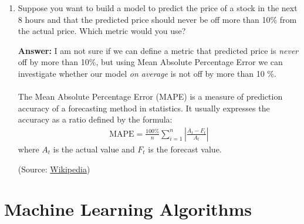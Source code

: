 \documentclass{article}
\newenvironment{QandA}{\begin{enumerate}[label=\arabic*.]}{\end{enumerate}}
\newenvironment{answer}{\par\normalfont \textbf{Answer:}}{}
\begin{document}
\begin{QandA}
    \item Suppose you want to build a model to predict the price of a stock in the next 8 hours and that the predicted price should never be off more than 10\% from the actual price. Which metric would you use?
    \begin{answer}
        I am not sure if we can define a metric that predicted price is \textit{never} off by more than 10\%, but using Mean Absolute Percentage Error we can investigate whether our model \textit{on average} is not off by more than 10 \%. \\\\
        The Mean Absolute Percentage Error (MAPE) is a measure of prediction accuracy of a forecasting method in statistics. It usually expresses the accuracy as a ratio defined by the formula:
        \begin{align*}
            \text{MAPE} = \frac{100\%}{n} \sum_{i=1}^n \left \vert  \frac{A_t - F_t}{A_t} \right \vert
        \end{align*}
        where $A_t$ is the actual value and $F_t$ is the forecast value.

        (Source: \href{https://en.wikipedia.org/wiki/Mean_absolute_percentage_error}{Wikipedia})
    \end{answer}
\end{QandA}

\section{Machine Learning Algorithms}
\end{document}
